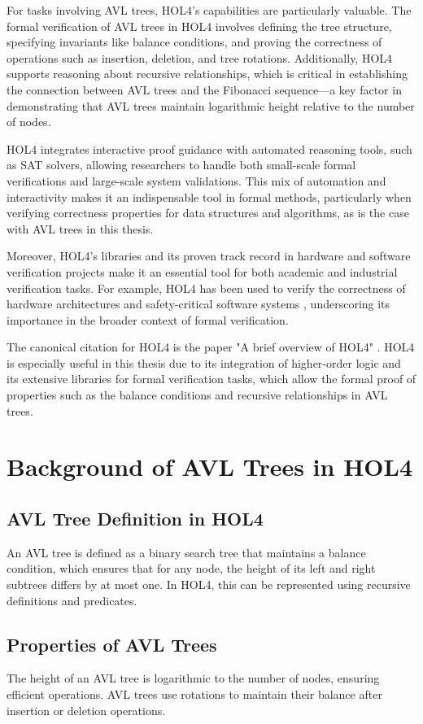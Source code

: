 \documentclass[12pt]{article}
\begin{document}
For tasks involving AVL trees, HOL4’s capabilities are particularly valuable. The formal verification of AVL trees in HOL4 involves defining the tree structure, specifying invariants like balance conditions, and proving the correctness of operations such as insertion, deletion, and tree rotations. Additionally, HOL4 supports reasoning about recursive relationships, which is critical in establishing the connection between AVL trees and the Fibonacci sequence—a key factor in demonstrating that AVL trees maintain logarithmic height relative to the number of nodes.

HOL4 integrates interactive proof guidance with automated reasoning tools, such as SAT solvers, allowing researchers to handle both small-scale formal verifications and large-scale system validations. This mix of automation and interactivity makes it an indispensable tool in formal methods, particularly when verifying correctness properties for data structures and algorithms, as is the case with AVL trees in this thesis.

Moreover, HOL4's libraries and its proven track record in hardware and software verification projects make it an essential tool for both academic and industrial verification tasks. For example, HOL4 has been used to verify the correctness of hardware architectures and safety-critical software systems \cite{avigad2014formally}, underscoring its importance in the broader context of formal verification.

The canonical citation for HOL4 is the paper "A brief overview of HOL4" \cite{gordon2008hol4}. HOL4 is especially useful in this thesis due to its integration of higher-order logic and its extensive libraries for formal verification tasks, which allow the formal proof of properties such as the balance conditions and recursive relationships in AVL trees.
\section{Background of AVL Trees in HOL4}
\subsection{AVL Tree Definition in HOL4}
An AVL tree is defined as a binary search tree that maintains a balance condition, which ensures that for any node, the height of its left and right subtrees differs by at most one. In HOL4, this can be represented using recursive definitions and predicates.

\subsection{Properties of AVL Trees}
The height of an AVL tree is logarithmic to the number of nodes, ensuring efficient operations. AVL trees use rotations to maintain their balance after insertion or deletion operations.
\end{document}
